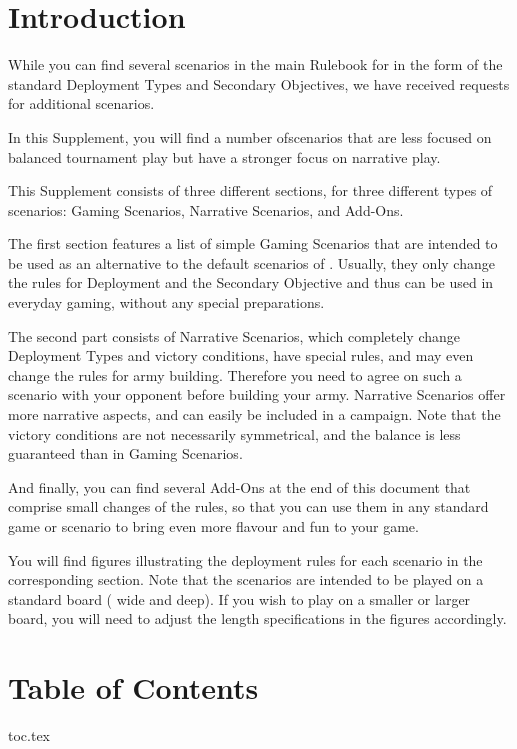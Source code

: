 \section*{Introduction}
\label{introduction}

While you can find several scenarios in the main Rulebook for \nameofthegame{} in the form of the standard Deployment Types and Secondary Objectives, we have received requests for additional scenarios.

In this Supplement, you will find a number ofscenarios that are less focused on balanced tournament play but have a stronger focus on narrative play.

This Supplement consists of three different sections, for three different types of scenarios: Gaming Scenarios, Narrative Scenarios, and Add-Ons.

The first section features a list of simple Gaming Scenarios that are intended to be used as an alternative to the default scenarios of \nameofthegame{}. Usually, they only change the rules for Deployment and the Secondary Objective and thus can be used in everyday gaming, without any special preparations.

The second part consists of Narrative Scenarios, which completely change Deployment Types and victory conditions, have special rules, and may even change the rules for army building. Therefore you need to agree on such a scenario with your opponent before building your army. Narrative Scenarios offer more narrative aspects, and can easily be included in a campaign. Note that the victory conditions are not necessarily symmetrical, and the balance is less guaranteed than in Gaming Scenarios.

And finally, you can find several Add-Ons at the end of this document that comprise small changes of the rules, so that you can use them in any standard game or scenario to bring even more flavour and fun to your game.

You will find figures illustrating the deployment rules for each scenario in the corresponding section. Note that the scenarios are intended to be played on a standard board ( wide and  deep). If you wish to play on a smaller or larger board, you will need to adjust the length specifications in the figures accordingly.

\section*{Table of Contents}

{toc.tex}
